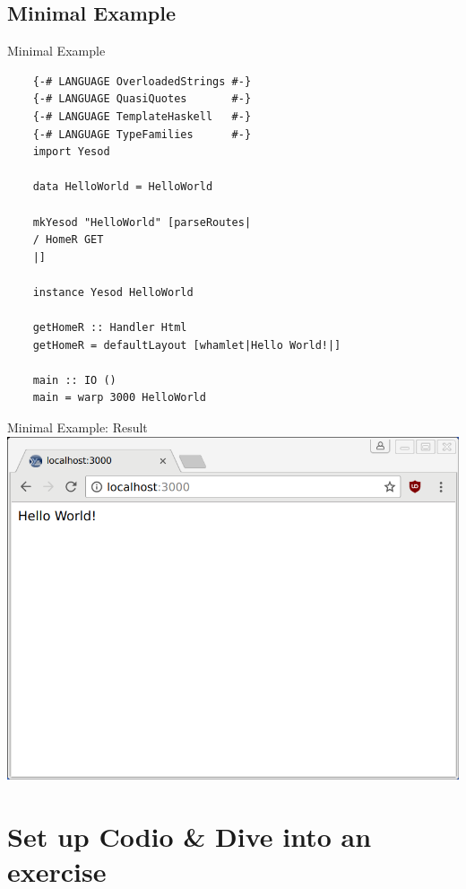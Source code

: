 \documentclass[pdf]{beamer}
\begin{document}
\subsection{Minimal Example}
\begin{frame}[fragile]{Minimal Example}
  \begin{verbatim}
    {-# LANGUAGE OverloadedStrings #-}
    {-# LANGUAGE QuasiQuotes       #-}
    {-# LANGUAGE TemplateHaskell   #-}
    {-# LANGUAGE TypeFamilies      #-}
    import Yesod

    data HelloWorld = HelloWorld

    mkYesod "HelloWorld" [parseRoutes|
    / HomeR GET
    |]

    instance Yesod HelloWorld

    getHomeR :: Handler Html
    getHomeR = defaultLayout [whamlet|Hello World!|]

    main :: IO ()
    main = warp 3000 HelloWorld
  \end{verbatim}
\end{frame}

\begin{frame}{Minimal Example: Result}
  \includegraphics[width=\textwidth,height=0.8\textheight,keepaspectratio]{example}
\end{frame}


\section{Set up Codio \& Dive into an exercise}
\end{document}
